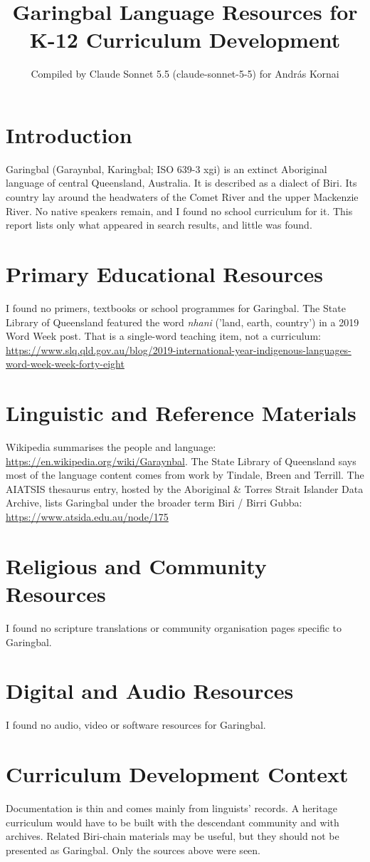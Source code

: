 \documentclass[12pt]{article}
\title{Garingbal Language Resources for K-12 Curriculum Development}
\author{Compiled by Claude Sonnet 5.5 (claude-sonnet-5-5) for Andr\'as Kornai}
\date{}
\begin{document}
\maketitle

\section{Introduction}
Garingbal (Garaynbal, Karingbal; ISO 639-3 xgi) is an extinct Aboriginal language of central Queensland, Australia. It is described as a dialect of Biri. Its country lay around the headwaters of the Comet River and the upper Mackenzie River. No native speakers remain, and I found no school curriculum for it. This report lists only what appeared in search results, and little was found.

\section{Primary Educational Resources}
I found no primers, textbooks or school programmes for Garingbal. The State Library of Queensland featured the word \emph{nhani} ('land, earth, country') in a 2019 Word Week post. That is a single-word teaching item, not a curriculum: \url{https://www.slq.qld.gov.au/blog/2019-international-year-indigenous-languages-word-week-week-forty-eight}

\section{Linguistic and Reference Materials}
Wikipedia summarises the people and language: \url{https://en.wikipedia.org/wiki/Garaynbal}. The State Library of Queensland says most of the language content comes from work by Tindale, Breen and Terrill. The AIATSIS thesaurus entry, hosted by the Aboriginal \& Torres Strait Islander Data Archive, lists Garingbal under the broader term Biri / Birri Gubba: \url{https://www.atsida.edu.au/node/175}

\section{Religious and Community Resources}
I found no scripture translations or community organisation pages specific to Garingbal.

\section{Digital and Audio Resources}
I found no audio, video or software resources for Garingbal.

\section{Curriculum Development Context}
Documentation is thin and comes mainly from linguists' records. A heritage curriculum would have to be built with the descendant community and with archives. Related Biri-chain materials may be useful, but they should not be presented as Garingbal. Only the sources above were seen.
\end{document}

